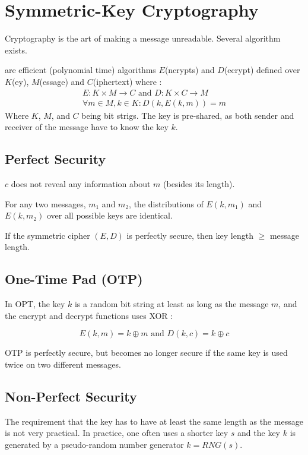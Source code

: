 \chapter{Symmetric-Key Cryptography}

Cryptography is the art of making a message unreadable. Several algorithm exists.

 are efficient (polynomial time) algorithms $E$(ncrypts) and $D$(ecrypt) defined over $K$(ey), $M$(essage) and $C$(iphertext) where :
\begin{align*}
E : K \times M \rightarrow C \text{ and } D : K \times C \rightarrow M\\
\forall m \in M, k \in K : D(k, E(k, m)) = m
\end{align*}
Where $K$, $M$, and $C$ being bit strigs. The key is pre-shared, as both sender and receiver of the message have to know the key $k$.

\section{Perfect Security}

$c$ does not reveal any information about $m$ (besides its length).

For any two messages, $m_1$ and $m_2$, the distributions of $E(k, m_1)$ and $E(k, m_2)$ over all possible keys are identical.

If the symmetric cipher $(E, D)$ is perfectly secure, then key length $\geq$ message length.

\section{One-Time Pad (OTP)}

In OPT, the key $k$ is a random bit string at least as long as the message $m$, and the encrypt and decrypt functions uses XOR :

\begin{equation*}
E(k, m) = k \oplus m \text{ and } D(k, c) = k \oplus c
\end{equation*}

OTP is perfectly secure, but becomes no longer secure if the same key is used twice on two different messages.

\section{Non-Perfect Security}

The requirement that the key has to have at least the same length as the message is not very practical. In practice, one often uses a shorter key $s$ and the key $k$ is generated by a pseudo-random number generator $k = RNG(s)$.

